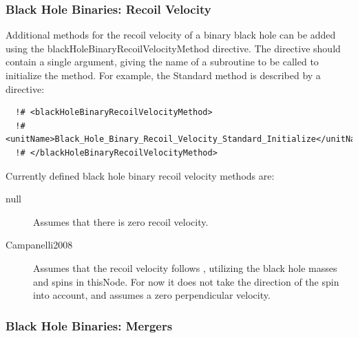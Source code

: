 \subsubsection{Black Hole Binaries: Recoil Velocity}

Additional methods for the recoil velocity of a binary black hole can be added using the {\normalfont \ttfamily blackHoleBinaryRecoilVelocityMethod} directive. The directive should contain a single argument, giving the name of a subroutine to be called to initialize the method. For example, the {\normalfont \ttfamily Standard} method is described by a directive:

\begin{verbatim}
  !# <blackHoleBinaryRecoilVelocityMethod>
  !#  <unitName>Black_Hole_Binary_Recoil_Velocity_Standard_Initialize</unitName>
  !# </blackHoleBinaryRecoilVelocityMethod>
\end{verbatim}

Currently defined black hole binary recoil velocity methods are:
\begin{description}
 \item [{\normalfont \ttfamily null}] Assumes that there is zero recoil velocity.
 \item [{\normalfont \ttfamily Campanelli2008}] Assumes that the recoil velocity follows \cite{campanelli_large_2007}, utilizing the black hole masses and spins in {\normalfont \ttfamily thisNode}. For now it does not take the direction of the spin into account, and assumes a zero perpendicular velocity.
\end{description}

\subsubsection{Black Hole Binaries: Mergers}\label{sec:BlackHoleBinaryMergers}

